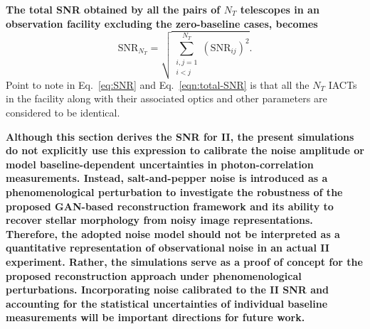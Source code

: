 {\bf The total SNR obtained by all the pairs of $N_T$ telescopes in an observation facility excluding the zero-baseline cases, becomes
\begin{equation}
	\mathrm{SNR}_{N_T}
	=
	\sqrt{\sum_{\substack{i,j=1 \\ i<j}}^{N_T}
	\left(\mathrm{SNR}_{ij}\right)^2}.
	\label{eqn:total-SNR}
\end{equation}}
Point to note in Eq.~\ref{eq:SNR} and Eq.~\ref{eqn:total-SNR} is that all the $N_T$ IACTs in the facility along with their associated optics and other parameters are considered to be identical.

{\bf Although this section derives the SNR for II, the present simulations do not explicitly use this expression to calibrate the noise amplitude or model baseline-dependent uncertainties in photon-correlation measurements. Instead, salt-and-pepper noise is introduced as a phenomenological perturbation to investigate the robustness of the proposed GAN-based reconstruction framework and its ability to recover stellar morphology from noisy image representations. Therefore, the adopted noise model should not be interpreted as a quantitative representation of observational noise in an actual II experiment. Rather, the simulations serve as a proof of concept for the proposed reconstruction approach under phenomenological perturbations. Incorporating noise calibrated to the II SNR and accounting for the statistical uncertainties of individual baseline measurements will be important directions for future work.}

